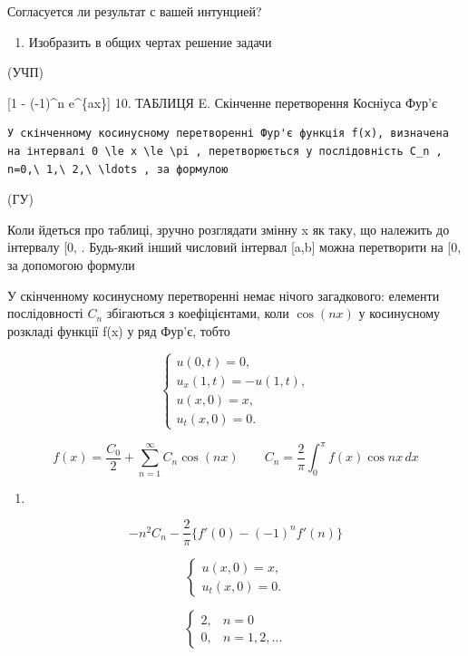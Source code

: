 \documentclass[
  ukrainian,
]{article}
\providecommand{\tightlist}{%
  \setlength{\itemsep}{0pt}\setlength{\parskip}{0pt}}
\begin{document}
Согласуется ли результат с вашей интунцией?

\begin{enumerate}
\def\labelenumi{\arabic{enumi}.}
\setcounter{enumi}{3}
\tightlist
\item
  Изобразить в общих чертах решение задачи
\end{enumerate}

(УЧП)

 {[}1 - (-1)\^{}n e\^{}\{ax\}{]} 10.
  ТАБЛИЦЯ E.
Скінченне перетворення Косніуса Фур'є

\begin{verbatim}
У скінченному косинусному перетворенні Фур'є функція f(x), визначена на інтервалі 0 \le x \le \pi , перетворюється у послідовність C_n , n=0,\ 1,\ 2,\ \ldots , за формулою
\end{verbatim}

(ГУ)

Коли йдеться про таблиці, зручно розглядати змінну x як таку, що
належить до інтервалу {[}0,\pi{]} . Будь-який інший числовий інтервал
{[}a,b{]} можна перетворити на {[}0,\pi{]} за допомогою формули

У скінченному косинусному перетворенні немає нічого загадкового:
елементи послідовності \(C_n\) збігаються з коефіцієнтами, коли
\(\cos{(nx)}\) у косинусному розкладі функції f(x) у ряд Фур'є, тобто

\[
\begin{cases} u(0, t) = 0, \\ u_x(1, t) = -u(1, t), \\ u(x, 0) = x, \\ u_t(x, 0) = 0. \end{cases}
\]

\[
f(x) = \frac{C_0}{2} + \sum_{n=1}^{\infty} C_n \cos(nx) \qquad C_n = \frac{2}{\pi} \int_{0}^{\pi} f(x) \cos nx \, dx
\]

\begin{enumerate}
\def\labelenumi{\arabic{enumi}.}
\tightlist
\item
\end{enumerate}

\[
-n^{2}C_{n} - \frac{2}{\pi} \{f'(0) - (-1)^{n} f'(n)\}
\]

\[
\begin{cases} u(x, 0) = x, \\ u_t(x, 0) = 0. \end{cases}
\]

\[
\begin{cases} 2, &n=0 \\ 0, &n=1, 2, \dots \end{cases}
\]
\end{document}
